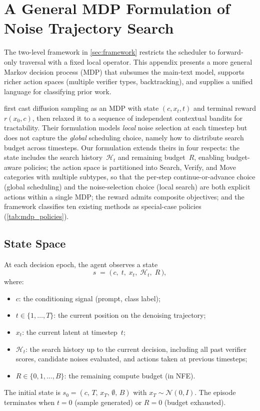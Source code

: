 \section{A General MDP Formulation of Noise Trajectory Search}
\label{sec:mdp}

The two-level framework in \cref{sec:framework} restricts the
scheduler to forward-only traversal with a fixed local operator.
This appendix presents a more general Markov decision process (MDP)
that subsumes the main-text model,
supports richer action spaces (multiple verifier types, backtracking),
and supplies a unified language for classifying prior work.

\citet{ramesh2025nts} first cast diffusion sampling as an MDP with
state $(c, x_t, t)$ and terminal reward $r(x_0, c)$, then relaxed
it to a sequence of independent contextual bandits for tractability.
Their formulation models \emph{local} noise selection at each
timestep but does not capture the \emph{global} scheduling
choice, namely how to distribute search budget across timesteps.
Our formulation extends theirs in four respects:
the state includes the search history~$\mathcal{H}_t$ and remaining
budget~$R$, enabling budget-aware policies;
the action space is partitioned into Search, Verify, and Move
categories with multiple subtypes, so that the per-step
continue-or-advance choice (global scheduling) and the
noise-selection choice (local search) are both explicit actions
within a single MDP;
the reward admits composite objectives;
and the framework classifies ten existing methods as
special-case policies (\cref{tab:mdp_policies}).

\subsection{State Space}

At each decision epoch, the agent observes a state
\[
  s \;=\; \bigl(\,c,\; t,\; x_t,\; \mathcal{H}_t,\; R\,\bigr),
\]
where:
\begin{itemize}
  \item $c$: the conditioning signal (prompt, class label);
  \item $t \in \{1,\dots,T\}$: the current position on the denoising trajectory;
  \item $x_t$: the current latent at timestep~$t$;
  \item $\mathcal{H}_t$: the search history up to the current decision,
    including all past verifier scores, candidate noises evaluated, and
    actions taken at previous timesteps;
  \item $R \in \{0,1,\dots,B\}$: the remaining compute budget (in NFE).
\end{itemize}
The initial state is $s_0 = (c,\, T,\, x_T,\, \emptyset,\, B)$ with
$x_T \sim \mathcal{N}(0,I)$.
The episode terminates when $t = 0$ (sample generated) or $R = 0$
(budget exhausted).

